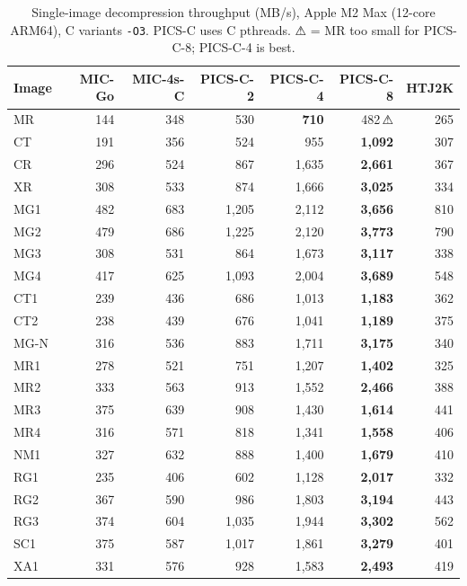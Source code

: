 \documentclass[10pt,twocolumn]{article}
\begin{document}
\begin{table}[h]
  \centering
  \caption{Single-image decompression throughput (MB/s), Apple M2 Max (12-core ARM64), C variants \texttt{-O3}. PICS-C uses C pthreads. ⚠ = MR too small for PICS-C-8; PICS-C-4 is best.}
  \label{tab:picsthroughput}
  \small
  \setlength{\tabcolsep}{3pt}
  \begin{tabular}{lrrrrrr}
    \toprule
    Image & MIC-Go & MIC-4s-C & PICS-C-2 & PICS-C-4 & PICS-C-8 & HTJ2K \\
    \midrule
    MR    & 144 & 348 & 530   & \textbf{710}  & 482\,⚠ & 265 \\
    CT    & 191 & 356 & 524   & 955   & \textbf{1,092} & 307 \\
    CR    & 296 & 524 & 867   & 1,635 & \textbf{2,661} & 367 \\
    XR    & 308 & 533 & 874   & 1,666 & \textbf{3,025} & 334 \\
    MG1   & 482 & 683 & 1,205 & 2,112 & \textbf{3,656} & 810 \\
    MG2   & 479 & 686 & 1,225 & 2,120 & \textbf{3,773} & 790 \\
    MG3   & 308 & 531 & 864   & 1,673 & \textbf{3,117} & 338 \\
    MG4   & 417 & 625 & 1,093 & 2,004 & \textbf{3,689} & 548 \\
    CT1   & 239 & 436 & 686   & 1,013 & \textbf{1,183} & 362 \\
    CT2   & 238 & 439 & 676   & 1,041 & \textbf{1,189} & 375 \\
    MG-N  & 316 & 536 & 883   & 1,711 & \textbf{3,175} & 340 \\
    MR1   & 278 & 521 & 751   & 1,207 & \textbf{1,402} & 325 \\
    MR2   & 333 & 563 & 913   & 1,552 & \textbf{2,466} & 388 \\
    MR3   & 375 & 639 & 908   & 1,430 & \textbf{1,614} & 441 \\
    MR4   & 316 & 571 & 818   & 1,341 & \textbf{1,558} & 406 \\
    NM1   & 327 & 632 & 888   & 1,400 & \textbf{1,679} & 410 \\
    RG1   & 235 & 406 & 602   & 1,128 & \textbf{2,017} & 332 \\
    RG2   & 367 & 590 & 986   & 1,803 & \textbf{3,194} & 443 \\
    RG3   & 374 & 604 & 1,035 & 1,944 & \textbf{3,302} & 562 \\
    SC1   & 375 & 587 & 1,017 & 1,861 & \textbf{3,279} & 401 \\
    XA1   & 331 & 576 & 928   & 1,583 & \textbf{2,493} & 419 \\
    \bottomrule
  \end{tabular}
\end{table}
\end{document}
